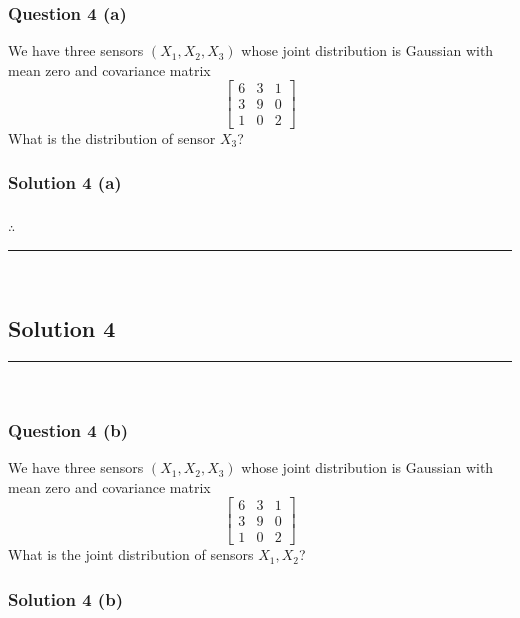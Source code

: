 \documentclass{article}
\begin{document}
\subsubsection*{Question 4 (a)}
\begin{flushleft}
    We have three sensors $(X_1, X_2, X_3)$ whose joint distribution is Gaussian with mean zero and covariance matrix 
    \[
    \begin{bmatrix}
    6 & 3 & 1 \\
    3 & 9 & 0 \\
    1 & 0 & 2
    \end{bmatrix}
    \]
    What is the distribution of sensor $X_3$? 
\end{flushleft}

\subsubsection*{Solution 4 (a)}


\subsubsection*{\normalfont}{$\therefore$ }

\noindent\rule{\textwidth}{0.4pt}\\

\newpage

\subsection*{Solution 4}
\noindent\rule{\textwidth}{0.4pt}\\
\subsubsection*{Question 4 (b)}
\begin{flushleft}
    We have three sensors $(X_1, X_2, X_3)$ whose joint distribution is Gaussian with mean zero and covariance matrix 
    \[
    \begin{bmatrix}
    6 & 3 & 1 \\
    3 & 9 & 0 \\
    1 & 0 & 2
    \end{bmatrix}
    \]
    What is the joint distribution of sensors $X_1, X_2$? 
\end{flushleft}

\subsubsection*{Solution 4 (b)}
\end{document}
